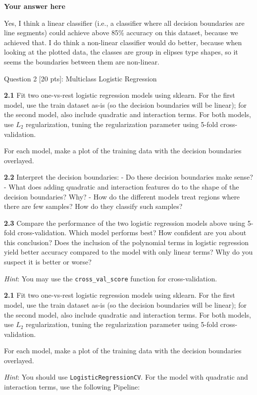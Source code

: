 \documentclass[11pt]{article}
\begin{document}
    \textbf{Your answer here}

Yes, I think a linear classifier (i.e., a classifier where all decision
boundaries are line segments) could achieve above 85\% accuracy on this
dataset, because we achieved that. I do think a non-linear classifier
would do better, because when looking at the plotted data, the classes
are group in elipses type shapes, so it seems the boundaries between
them are non-linear.

     Question 2 {[}20 pts{]}: Multiclass Logistic Regression

    \textbf{2.1} Fit two one-vs-rest logistic regression models using
sklearn. For the first model, use the train dataset as-is (so the
decision boundaries will be linear); for the second model, also include
quadratic and interaction terms. For both models, use \(L_2\)
regularization, tuning the regularization parameter using 5-fold
cross-validation.

For each model, make a plot of the training data with the decision
boundaries overlayed.

\textbf{2.2} Interpret the decision boundaries: - Do these decision
boundaries make sense? - What does adding quadratic and interaction
features do to the shape of the decision boundaries? Why? - How do the
different models treat regions where there are few samples? How do they
classify such samples?

\textbf{2.3} Compare the performance of the two logistic regression
models above using 5-fold cross-validation. Which model performs best?
How confident are you about this conclusion? Does the inclusion of the
polynomial terms in logistic regression yield better accuracy compared
to the model with only linear terms? Why do you suspect it is better or
worse?

\emph{Hint}: You may use the \texttt{cross\_val\_score} function for
cross-validation.

    \textbf{2.1} Fit two one-vs-rest logistic regression models using
sklearn. For the first model, use the train dataset as-is (so the
decision boundaries will be linear); for the second model, also include
quadratic and interaction terms. For both models, use \(L_2\)
regularization, tuning the regularization parameter using 5-fold
cross-validation.

For each model, make a plot of the training data with the decision
boundaries overlayed.

    \emph{Hint}: You should use \texttt{LogisticRegressionCV}. For the model
with quadratic and interaction terms, use the following Pipeline:
\end{document}
